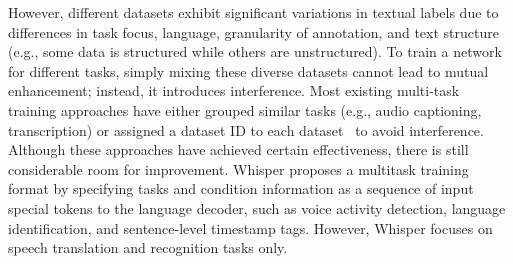 \documentclass{article}
\begin{document}
However, different datasets exhibit significant variations in textual labels due to differences in task focus, language, granularity of annotation, and text structure (e.g., some data is structured while others are unstructured). To train a network for different tasks, simply mixing these diverse datasets cannot lead to mutual enhancement; instead, it introduces interference. Most existing multi-task training approaches have either grouped similar tasks (e.g., audio captioning, transcription) or assigned a dataset ID to each dataset~\citep{wang2023blsp, Macaw-LLM, NextGPT, LTU, shu2023llasm} to avoid interference. Although these approaches have achieved certain effectiveness, there is still considerable room for improvement. Whisper proposes a multitask training format by specifying tasks and condition information as a sequence of input special tokens to the language decoder, such as voice activity detection, language identification, and sentence-level timestamp tags. However, Whisper focuses on speech translation and recognition tasks only.
\end{document}
